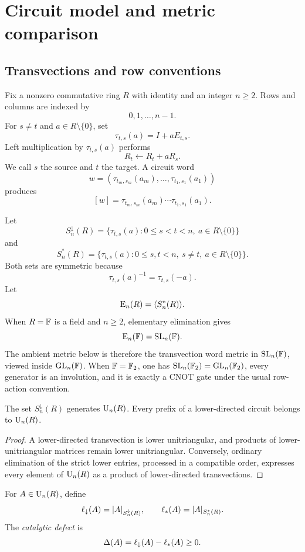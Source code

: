 \section{Circuit model and metric comparison}\label{sec:model}

\subsection{Transvections and row conventions}

Fix a nonzero commutative ring $R$ with identity and an integer $n\ge2$.  Rows and columns are indexed by
\[
0,1,\ldots,n-1.
\]
For $s\ne t$ and $a\in R\setminus\{0\}$, set
\[
\tau_{t,s}(a)=I+aE_{t,s}.
\]
Left multiplication by $\tau_{t,s}(a)$ performs
\[
R_t\longleftarrow R_t+aR_s.
\]
We call $s$ the source and $t$ the target.  A circuit word
\[
w=(\tau_{t_m,s_m}(a_m),\ldots,\tau_{t_1,s_1}(a_1))
\]
produces
\[
[w]=\tau_{t_m,s_m}(a_m)\cdots\tau_{t_1,s_1}(a_1).
\]

Let
\[
S_n^\downarrow(R)
=\{\tau_{t,s}(a):0\le s<t<n,\ a\in R\setminus\{0\}\}
\]
and
\[
S_n^*(R)
=\{\tau_{t,s}(a):0\le s,t<n,\ s\ne t,\ a\in R\setminus\{0\}\}.
\]
Both sets are symmetric because
\[
\tau_{t,s}(a)^{-1}=\tau_{t,s}(-a).
\]
Let
\[
\operatorname{E}_n(R)=\langle S_n^*(R)\rangle.
\]
When $R=\mathbb F$ is a field and $n\ge2$, elementary elimination gives
\[
\operatorname{E}_n(\mathbb F)=\operatorname{SL}_n(\mathbb F).
\]
The ambient metric below is therefore the transvection word metric in $\operatorname{SL}_n(\mathbb F)$, viewed inside $\operatorname{GL}_n(\mathbb F)$.  When $\mathbb F=\mathbb F_2$, one has $\operatorname{SL}_n(\mathbb F_2)=\operatorname{GL}_n(\mathbb F_2)$, every generator is an involution, and it is exactly a CNOT gate under the usual row-action convention.

\begin{lemma}\label{lem:lower-generates}
The set $S_n^\downarrow(R)$ generates $\operatorname{U}_n(R)$.  Every prefix of a lower-directed circuit belongs to $\operatorname{U}_n(R)$.
\end{lemma}

\begin{proof}
A lower-directed transvection is lower unitriangular, and products of lower-unitriangular matrices remain lower unitriangular.  Conversely, ordinary elimination of the strict lower entries, processed in a compatible order, expresses every element of $\operatorname{U}_n(R)$ as a product of lower-directed transvections.
\end{proof}

\begin{definition}\label{def:lengths}
For $A\in\operatorname{U}_n(R)$, define
\[
\ell_{\downarrow}(A)=|A|_{S_n^\downarrow(R)},
\qquad
\ell_{*}(A)=|A|_{S_n^*(R)}.
\]
The \emph{catalytic defect} is
\[
\Delta(A)=\ell_{\downarrow}(A)-\ell_{*}(A)\ge0.
\]
\end{definition}


